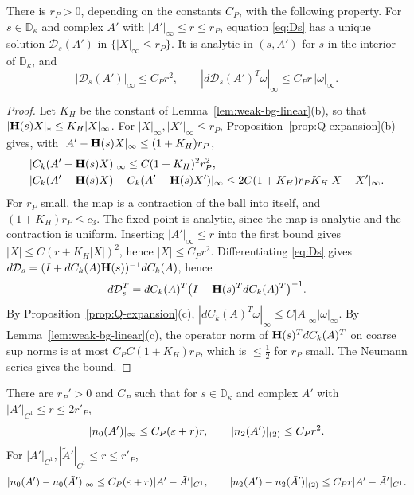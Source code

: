 \begin{lemma}\label{lem:Ds}
There is $r_P>0$, depending on the constants $C_P$, with the following property. For $s\in\mathbb D_\kappa$ and complex $A'$ with $|A'|_\infty\le r\le r_P$, equation \eqref{eq:Ds} has a unique solution $\mathcal D_s(A')$ in $\{|X|_\infty\le r_P\}$. It is analytic in $(s,A')$ for $s$ in the interior of $\mathbb D_\kappa$, and
\[
|\mathcal D_s(A')|_\infty\le C_Pr^2,\qquad|d\mathcal D_s(A')^T\omega|_\infty\le C_Pr\,|\omega|_\infty .
\]
\end{lemma}

\begin{proof}
Let $K_H$ be the constant of Lemma~\ref{lem:weak-bg-linear}(b), so that $|\mathbf H(s)X|_*\le K_H|X|_\infty$. For $|X|_\infty,|X'|_\infty\le r_P$, Proposition~\ref{prop:Q-expansion}(b) gives, with $|A'-\mathbf H(s)X|_\infty\le(1+K_H)r_P$,
\[
\begin{aligned}
&|C_k(A'-\mathbf H(s)X)|_\infty\le C(1+K_H)^2r_P^2,\\
&|C_k(A'-\mathbf H(s)X)-C_k(A'-\mathbf H(s)X')|_\infty\le2C(1+K_H)r_PK_H|X-X'|_\infty .
\end{aligned}
\]
For $r_P$ small, the map is a contraction of the ball into itself, and $(1+K_H)r_P\le c_3$. The fixed point is analytic, since the map is analytic and the contraction is uniform. Inserting $|A'|_\infty\le r$ into the first bound gives $|X|\le C(r+K_H|X|)^2$, hence $|X|\le C_Pr^2$. Differentiating \eqref{eq:Ds} gives $d\mathcal D_s=(I+dC_k(A)\mathbf H(s))^{-1}dC_k(A)$, hence
\[
d\mathcal D_s^T=dC_k(A)^T\big(I+\mathbf H(s)^TdC_k(A)^T\big)^{-1}.
\]
By Proposition~\ref{prop:Q-expansion}(c), $|dC_k(A)^T\omega|_\infty\le C|A|_\infty|\omega|_\infty$. By Lemma~\ref{lem:weak-bg-linear}(c), the operator norm of $\mathbf H(s)^TdC_k(A)^T$ on coarse sup norms is at most $C_PC(1+K_H)r_P$, which is $\le\frac12$ for $r_P$ small. The Neumann series gives the bound.
\end{proof}

\begin{lemma}\label{lem:gradV-s}
There are $r_P'>0$ and $C_P$ such that for $s\in\mathbb D_\kappa$ and complex $A'$ with $|A'|_{C^1}\le r\le2r'_P$,
\[
|n_0(A')|_\infty\le C_P(\varepsilon+r)r,\qquad|n_2(A')|_{(2)}\le C_Pr^2 .
\]
For $|A'|_{C^1},|\tilde A'|_{C^1}\le r\le r'_P$,
\[
|n_0(A')-n_0(\tilde A')|_\infty\le C_P(\varepsilon+r)|A'-\tilde A'|_{C^1},\qquad|n_2(A')-n_2(\tilde A')|_{(2)}\le C_Pr|A'-\tilde A'|_{C^1} .
\]
\end{lemma}

